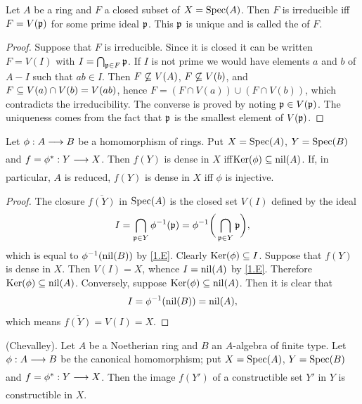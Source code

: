 \documentclass[../main]{subfiles}
\begin{document}
\begin{parlemma}\label{lem:06.01}
Let $A$ be a ring and $F$ a closed subset of $X= \operatorname{Spec}(A)$. Then $F$ is irreducible iff $F=V(\mathfrak{p})$ for some prime ideal $\mathfrak{p}$. This $\mathfrak{p}$ is unique and is called the  of $F$.
\end{parlemma}

\begin{proof} Suppose that $F$ is irreducible. Since it is closed it can be written $F=V( I)$ with $ I = \bigcap_{\mathfrak{p} \in F} \mathfrak{p}$. If $ I$ is not prime we would have elements $a$ and $b$ of $A -  I$ such that $ab \in  I$. Then 
$F \not \subseteq V(A)$, $F \not \subseteq V(b)$, and $F \subseteq V(a) \cap V(b) = V(ab)$, hence $F = (F \cap V(a)) \cup (F \cap V(b))$, which contradicts the irreducibility. The converse is proved by noting $\mathfrak{p} \in V(\mathfrak{p})$. The uniqueness comes from the fact that $\mathfrak{p}$ is the smallest element of $V(\mathfrak{p})$.
\end{proof}

\begin{lemma}\label{lem:06.02} 
Let $\phi : A \varrightarrow{} B$ be a homomorphism of rings. Put $X = \operatorname{Spec}(A)$, $Y=\operatorname{Spec}(B)$ and $f = \SpecInduced{\phi}: Y \varrightarrow{} X$. Then $f(Y)$ is dense in $X$ iff\newline $\operatorname{Ker}(\phi) \subseteq \operatorname{nil}(A)$. If, in particular, $A$ is reduced, $f(Y)$ is dense in $X$ iff $\phi$ is injective.
\end{lemma}

\begin{proof} The closure $\overline{f(Y)}$ in $\operatorname{Spec}(A)$ is the closed set $V( I)$ defined by the ideal
\[
I = \bigcap_{\mathfrak{p} \in Y} \phi ^{-1} (\mathfrak{p}) = \phi ^{-1} \bigg(\bigcap_{\mathfrak{p} \in Y} \mathfrak{p} \bigg),
\]
which is equal to $\phi^{-1} (\operatorname{nil}(B))$ by \ref{1.E}. Clearly $\operatorname{Ker}(\phi) \subseteq  I$. Suppose that $f(Y)$ is dense in $X$. Then $V( I) = X$, whence $ I = \operatorname{nil}(A)$ by \ref{1.E}. Therefore \newline $\operatorname{Ker}(\phi) \subseteq \operatorname{nil}(A)$. Conversely, suppose $\operatorname{Ker}(\phi) \subseteq \operatorname{nil}(A)$. Then it is clear that 
\[
 I = \phi ^{-1} (\operatorname{nil}(B)) = \operatorname{nil}(A),
\]
which means $\overline{f(Y)} = V( I ) = X$.
\end{proof}
\begin{partheorem}\label{thm:006}
(Chevalley). Let $A$ be a Noetherian ring and $B$ an $A$-algebra of finite type. Let $\phi : A \varrightarrow{} B$ be the canonical homomorphism; put $X = \operatorname{Spec}(A)$, $Y = \operatorname{Spec}(B)$ and $f= \SpecInduced{\phi}: Y \varrightarrow{} X$. Then the image $f(Y')$ of a constructible set $Y'$ in $Y$ is constructible in $X$.
\end{partheorem}
\end{document}
